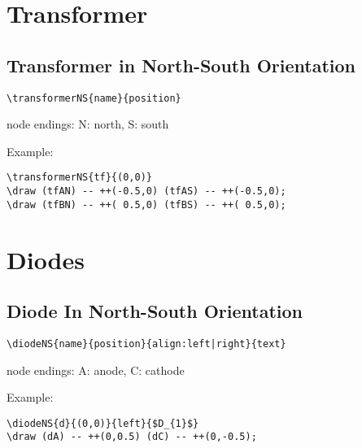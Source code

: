 \documentclass[parskip=full]{scrartcl}
\begin{document}
\section{Transformer}

\subsection{Transformer in North-South Orientation}

\begin{verbatim}
\transformerNS{name}{position}
\end{verbatim}
node endings: N: north, S: south

Example:\\
\begin{minipage}{0.8\textwidth}
\begin{verbatim}
\transformerNS{tf}{(0,0)}
\draw (tfAN) -- ++(-0.5,0) (tfAS) -- ++(-0.5,0);
\draw (tfBN) -- ++( 0.5,0) (tfBS) -- ++( 0.5,0);
\end{verbatim}
\end{minipage}
\begin{minipage}{0.19\textwidth}
\end{minipage}

\section{Diodes}

\subsection{Diode In North-South Orientation}

\begin{verbatim}
\diodeNS{name}{position}{align:left|right}{text}
\end{verbatim}
node endings: A: anode, C: cathode

Example:\\
\begin{minipage}{0.8\textwidth}
\begin{verbatim}
\diodeNS{d}{(0,0)}{left}{$D_{1}$}
\draw (dA) -- ++(0,0.5) (dC) -- ++(0,-0.5);
\end{verbatim}
\end{minipage}
\begin{minipage}{0.19\textwidth}
\end{minipage}
\end{document}
